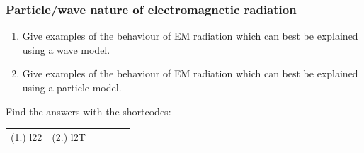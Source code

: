             \subsubsection{  Particle/wave nature of electromagnetic radiation }
            \nopagebreak
      \label{m38777*id187078}\begin{enumerate}[noitemsep, label=\textbf{\arabic*}. ] 
            \label{m38777*uid1}\item Give examples of the behaviour of EM radiation which can best be explained using a wave model.\newline
\label{m38777*uid2}\item Give examples of the behaviour of EM radiation which can best be explained using a particle model.\newline
\end{enumerate}
    \label{m38777*cid4}
\par {} Find the answers with the shortcodes:
 \par \begin{tabular}[h]{cccccc}
 (1.) l22  &  (2.) l2T  & \end{tabular}
